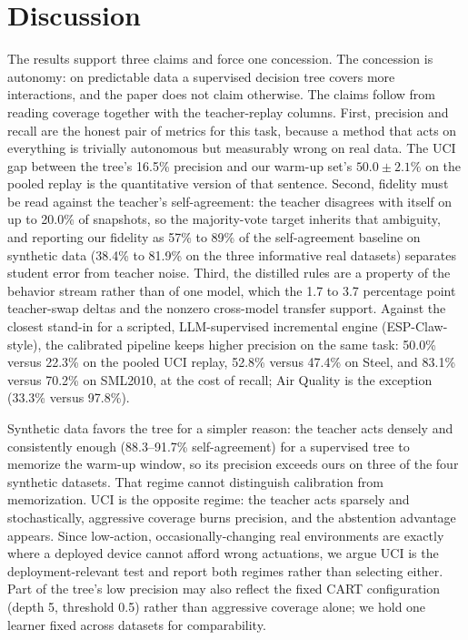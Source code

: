 \documentclass[11pt,a4paper]{article}
\begin{document}
\section{Discussion}

The results support three claims and force one concession. The concession is
autonomy: on predictable data a supervised decision tree covers more
interactions, and the paper does not claim otherwise. The claims follow from
reading coverage together with the teacher-replay columns. First, precision
and recall are the honest pair of metrics for this task, because a method
that acts on everything is trivially autonomous but measurably wrong on real
data. The UCI gap between the tree's 16.5\% precision and our warm-up set's
$50.0 \pm 2.1\%$ on the pooled replay is the quantitative version of that
sentence. Second, fidelity must be read against the teacher's
self-agreement: the teacher disagrees with itself on up to 20.0\% of
snapshots, so the majority-vote target inherits that ambiguity, and reporting
our fidelity as 57\% to 89\% of the self-agreement baseline on synthetic data
(38.4\% to 81.9\% on the three informative real datasets) separates student
error from teacher noise. Third, the distilled rules are a property of the
behavior stream rather than of one model, which the 1.7 to 3.7 percentage
point teacher-swap deltas and the nonzero cross-model transfer support.
Against the closest stand-in for a scripted, LLM-supervised incremental engine
(ESP-Claw-style), the calibrated pipeline keeps higher precision on the same
task: 50.0\% versus 22.3\% on the pooled UCI replay, 52.8\% versus 47.4\% on
Steel, and 83.1\% versus 70.2\% on SML2010, at the cost of recall; Air Quality
is the exception (33.3\% versus 97.8\%).

Synthetic data favors the tree for a simpler reason: the teacher acts densely
and consistently enough (88.3--91.7\% self-agreement) for a supervised tree to
memorize the warm-up window, so its precision exceeds ours on three of the
four synthetic datasets. That regime cannot distinguish
calibration from memorization. UCI is the opposite regime: the teacher acts
sparsely and stochastically, aggressive coverage burns precision, and the
abstention advantage appears. Since low-action, occasionally-changing real
environments are exactly where a deployed device cannot afford wrong
actuations, we argue UCI is the deployment-relevant test and report both
regimes rather than selecting either. Part of the tree's low precision may
also reflect the fixed CART configuration (depth 5, threshold 0.5) rather
than aggressive coverage alone; we hold one learner fixed across datasets for
comparability.
\end{document}
